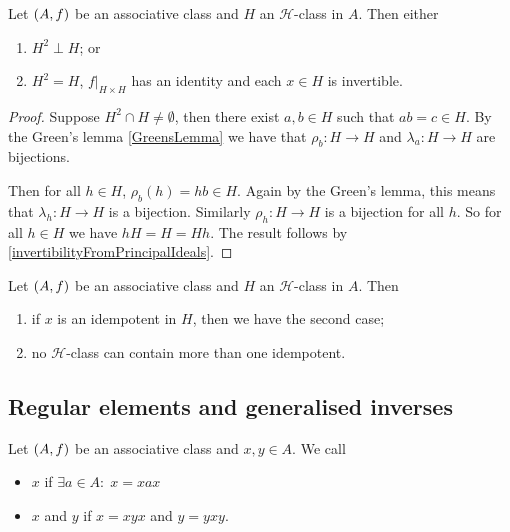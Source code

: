 \begin{theorem}
Let $\left( A, f \right)$ be an associative class and $H$ an $\mathcal{H}$-class in $A$. Then either
\begin{enumerate}
\item $H^2\perp H$; or
\item $H^2 = H$, $f|_{H\times H}$ has an identity and each $x\in H$ is invertible.
\end{enumerate}
\end{theorem}
\begin{proof}
Suppose $H^2\cap H \neq \emptyset$, then there exist $a,b\in H$ such that $ab = c\in H$. By the Green's lemma \ref{GreensLemma} we have that $\rho_b:H\to H$ and $\lambda_a: H\to H$ are bijections.

Then for all $h\in H$, $\rho_b(h) = hb \in H$. Again by the Green's lemma, this means that $\lambda_h: H\to H$ is a bijection. Similarly $\rho_h: H\to H$ is a bijection for all $h$. So for all $h\in H$ we have $hH = H = Hh$. The result follows by \ref{invertibilityFromPrincipalIdeals}.
\end{proof}
\begin{corollary} \label{GreensTheoremCorollary}
Let $\left( A, f \right)$ be an associative class and $H$ an $\mathcal{H}$-class in $A$. Then
\begin{enumerate}
\item if $x$ is an idempotent in $H$, then we have the second case;
\item no $\mathcal{H}$-class can contain more than one idempotent. 
\end{enumerate}
\end{corollary}

\subsection{Regular elements and generalised inverses}
\begin{definition}
Let $\left( A, f \right)$ be an associative class and $x, y\in A$. We call
\begin{itemize}
\item $x$  if $\exists a\in A: \; x = xax$
\item $x$ and $y$  if $x = xyx$ and $y = yxy$.
\end{itemize}
\end{definition}


